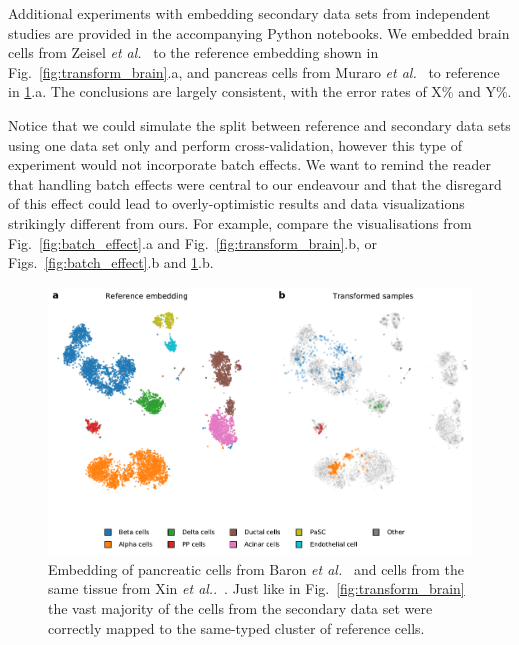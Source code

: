 \documentclass[runningheads]{llncs}
\newcommand{\etal}{\textit{et al.}}
\begin{document}
Additional experiments with embedding secondary data sets from independent
studies are provided in the accompanying Python notebooks. We embedded brain
cells from Zeisel \etal~\cite{zeisel2015} to the reference embedding shown in
Fig.~\ref{fig:transform_brain}.a, and pancreas cells from Muraro
\etal~\cite{muraro2016} to reference in \ref{fig:transform_pancreas}.a. The
conclusions are largely consistent, with the error rates of X\% and Y\%.

Notice that we could simulate the split between reference and secondary data
sets using one data set only and perform cross-validation, however this type of
experiment would not incorporate batch effects. We want to remind the reader
that handling batch effects were central to our endeavour and that the
disregard of this effect could lead to overly-optimistic results and data
visualizations strikingly different from ours. For example, compare the
visualisations from Fig.~\ref{fig:batch_effect}.a and
Fig.~\ref{fig:transform_brain}.b, or Figs.~\ref{fig:batch_effect}.b and
\ref{fig:transform_pancreas}.b.


\begin{figure}[htb]
  \includegraphics[width=\textwidth]{figures/transform_pancreas.pdf}
  \caption{Embedding of pancreatic cells from Baron \etal~\cite{baron2016} and
  cells from the same tissue from Xin \etal.~\cite{xin2016}. Just like in
  Fig.~\ref{fig:transform_brain} the vast majority of the cells from the
  secondary data set were correctly mapped to the same-typed cluster of
  reference cells.}
  \label{fig:transform_pancreas}
\end{figure}
\end{document}
